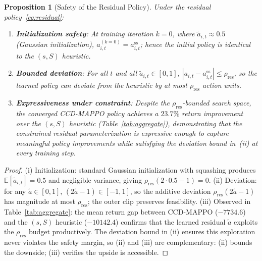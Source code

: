 \documentclass[11pt,a4paper]{article}
\theoremstyle{plain}
\newtheorem{proposition}{Proposition}
\theoremstyle{definition}
\newcommand{\E}{\mathbb{E}}
\begin{document}
\begin{proposition}[Safety of the Residual Policy]
\label{prop:safety}
Under the residual policy~\eqref{eq:residual}:
\begin{enumerate}[label=(\roman*),itemsep=2pt]
  \item \textbf{Initialization safety}: At training iteration $k=0$, where
    $\tilde{a}_{i,t}\approx0.5$ (Gaussian initialization),
    $a_{i,t}^{(k=0)} = a^{\mathrm{ss}}_{i,t}$; hence the initial policy is identical to
    the $(s,S)$ heuristic.
  \item \textbf{Bounded deviation}: For all $t$ and all $\tilde{a}_{i,t}\in[0,1]$,
    $|a_{i,t}-a^{\mathrm{ss}}_{i,t}|\le\rho_{\mathrm{res}}$, so the learned policy can
    deviate from the heuristic by at most $\rho_{\mathrm{res}}$ action units.
  \item \textbf{Expressiveness under constraint}: Despite the $\rho_{\mathrm{res}}$-bounded
    search space, the converged CCD-MAPPO policy achieves a $23.7\%$ return improvement
    over the $(s,S)$ heuristic (Table~\ref{tab:aggregate}), demonstrating that the constrained
    residual parameterization is expressive enough to capture meaningful policy improvements
    while satisfying the deviation bound in~(ii) at every training step.
\end{enumerate}
\end{proposition}

\begin{proof}
(i) Initialization: standard Gaussian initialization with squashing produces
$\E[\tilde{a}_{i,t}]=0.5$ and negligible variance, giving
$\rho_{\mathrm{res}}(2\cdot0.5-1)=0$.  (ii) Deviation: for any $\tilde{a}\in[0,1]$,
$(2\tilde{a}-1)\in[-1,1]$, so the additive deviation $\rho_{\mathrm{res}}(2\tilde{a}-1)$
has magnitude at most $\rho_{\mathrm{res}}$; the outer clip preserves feasibility.
(iii) Observed in Table~\ref{tab:aggregate}: the mean return gap between CCD-MAPPO
($-7734.6$) and the $(s,S)$ heuristic ($-10142.4$) confirms that the learned residual
$\tilde{a}$ exploits the $\rho_{\mathrm{res}}$ budget productively.  The deviation bound
in (ii) ensures this exploration never violates the safety margin, so (ii) and (iii)
are complementary: (ii) bounds the downside; (iii) verifies the upside is accessible.
\end{proof}
\end{document}
